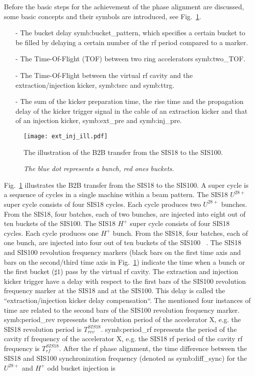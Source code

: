 
Before the basic steps for the achievement of the phase alignment are discussed, some basic concepts and their symbols are introduced, see Fig.~\ref{ext_inj_kicker}.

\begin{itemize}
\item[-] The bucket delay \gls{symb:bucket_pattern}, which specifies a certain bucket to be filled by delaying a certain number of the rf period compared to a marker.
\item[-] The Time-Of-Flight (\gls{TOF}) between two ring accelerators \gls{symb:two_TOF}. 
\item[-] The Time-Of-Flight between the virtual rf cavity and the extraction/injection kicker, \gls{symb:tsrc} and \gls{symb:ttrg}. 
\item[-] The sum of the kicker preparation time, the rise time and the propagation delay of the kicker trigger signal in the cable of an extraction kicker and that of an injection kicker, \gls{symb:ext_pre} and \gls{symb:inj_pre}.
\end{itemize}
\begin{landscape}
\begin{figure}[!htb]
   \centering   
   \texttt{[image: ext\_inj\_ill.pdf]}
   \caption{The illustration of the B2B transfer from the SIS18 to the SIS100.}
	\caption*{\textsl{\small{The blue dot represents a bunch, red ones buckets.}}}
   \label{ext_inj_kicker}
\end{figure}
\end{landscape}
Fig.~\ref{ext_inj_kicker} illustrates the B2B transfer from the SIS18 to the SIS100. A super cycle is a sequence of cycles in a single machine within a beam pattern. The SIS18 $U^{28+}$ super cycle consists of four SIS18 cycles. Each cycle produces two $U^{28+}$ bunches. From the SIS18, four batches, each of two bunches, are injected into eight out of ten buckets of the SIS100. The SIS18 $H^{+}$ super cycle consists of four SIS18 cycles. Each cycle produces one $H^{+}$ bunch. From the SIS18, four batches, each of one bunch, are injected into four out of ten buckets of the SIS100 ~\cite{liebermann_fair_2013, liebermann_sis100_2013}. The SIS18 and SIS100 revolution frequency markers (black bars on the first time axis and bars on the second/third time axis in Fig.~\ref{ext_inj_kicker}) indicate the time when a bunch or the first bucket ($\sharp1$) pass by the virtual rf cavity. The extraction and injection kicker trigger have a delay with respect to the first bars of the SIS100 revolution frequency marker at the SIS18 and at the SIS100. This delay is called the ``extraction/injection kicker delay compensation``. The mentioned four instances of time are related to the second bars of the SIS100 revolution frequency marker. \gls{symb:period_rev} represents the revolution period of the accelerator X, e.g. the SIS18 revolution period is $T_{\mathit{rev}}^{\mathit{SIS18}}$. \gls{symb:period_rf} represents the period of the cavity rf frequency of the accelerator X, e.g. the SIS18 rf period of the cavity rf frequency is $T_{\mathit{rf}}^{\mathit{SIS18}}$. After the rf phase alignment, the time difference between the SIS18 and SIS100 synchronization frequency (denoted as \gls{symb:diff_sync}) for the $U^{28+}$ and $H^{+}$ odd bucket injection is
